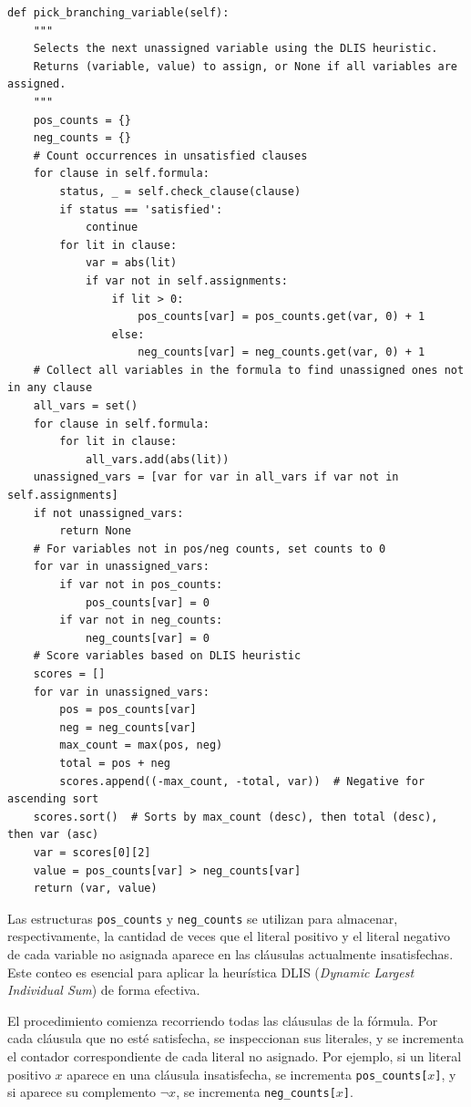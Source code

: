 \begin{lstlisting}
def pick_branching_variable(self):
    """
    Selects the next unassigned variable using the DLIS heuristic.
    Returns (variable, value) to assign, or None if all variables are assigned.
    """
    pos_counts = {}
    neg_counts = {}
    # Count occurrences in unsatisfied clauses
    for clause in self.formula:
        status, _ = self.check_clause(clause)
        if status == 'satisfied':
            continue
        for lit in clause:
            var = abs(lit)
            if var not in self.assignments:
                if lit > 0:
                    pos_counts[var] = pos_counts.get(var, 0) + 1
                else:
                    neg_counts[var] = neg_counts.get(var, 0) + 1
    # Collect all variables in the formula to find unassigned ones not in any clause
    all_vars = set()
    for clause in self.formula:
        for lit in clause:
            all_vars.add(abs(lit))
    unassigned_vars = [var for var in all_vars if var not in self.assignments]
    if not unassigned_vars:
        return None
    # For variables not in pos/neg counts, set counts to 0
    for var in unassigned_vars:
        if var not in pos_counts:
            pos_counts[var] = 0
        if var not in neg_counts:
            neg_counts[var] = 0
    # Score variables based on DLIS heuristic
    scores = []
    for var in unassigned_vars:
        pos = pos_counts[var]
        neg = neg_counts[var]
        max_count = max(pos, neg)
        total = pos + neg
        scores.append((-max_count, -total, var))  # Negative for ascending sort
    scores.sort()  # Sorts by max_count (desc), then total (desc), then var (asc)
    var = scores[0][2]
    value = pos_counts[var] > neg_counts[var]
    return (var, value)

\end{lstlisting}

Las estructuras \texttt{pos\_counts} y \texttt{neg\_counts} se utilizan para almacenar, respectivamente, la cantidad de veces que el literal positivo y el literal negativo de cada variable no asignada aparece en las cláusulas actualmente insatisfechas. Este conteo es esencial para aplicar la heurística DLIS (\textit{Dynamic Largest Individual Sum}) de forma efectiva.

El procedimiento comienza recorriendo todas las cláusulas de la fórmula. Por cada cláusula que no esté satisfecha, se inspeccionan sus literales, y se incrementa el contador correspondiente de cada literal no asignado. Por ejemplo, si un literal positivo $x$ aparece en una cláusula insatisfecha, se incrementa \texttt{pos\_counts[$x$]}, y si aparece su complemento $\neg x$, se incrementa \texttt{neg\_counts[$x$]}.

